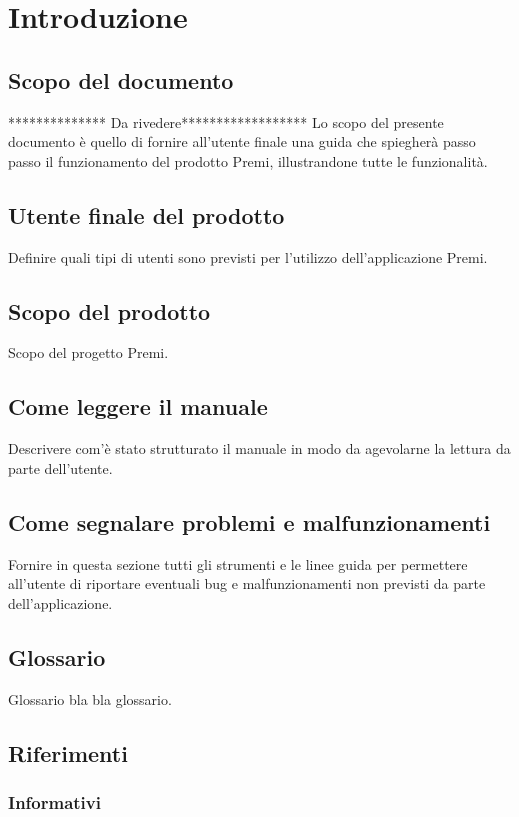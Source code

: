 \section{Introduzione}
\subsection{Scopo del documento}

************** Da rivedere******************
Lo scopo del presente documento è quello di fornire all'utente finale una guida che spiegherà passo passo il funzionamento del prodotto Premi, illustrandone tutte le funzionalità.

\subsection{Utente finale del prodotto}
Definire quali tipi di utenti sono previsti per l'utilizzo dell'applicazione Premi.

\subsection{Scopo del prodotto}
Scopo del progetto Premi.

\subsection{Come leggere il manuale}
Descrivere com'è stato strutturato il manuale in modo da agevolarne la lettura da parte dell'utente.

\subsection{Come segnalare problemi e malfunzionamenti}
Fornire in questa sezione tutti gli strumenti e le linee guida per permettere all'utente di riportare eventuali bug e malfunzionamenti non previsti da parte dell'applicazione.

\subsection{Glossario}
Glossario bla bla glossario.

\subsection{Riferimenti}
\subsubsection{Informativi}
